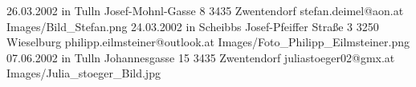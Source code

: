 
\begin{Diplomandenvorstellung}
		  {26.03.2002 in Tulln}
		  {Josef-Mohnl-Gasse 8}
		  {3435 Zwentendorf}
		  {
		  }
		  {stefan.deimel@aon.at}
		  {Images/Bild_Stefan.png}
\newpage	  
\if{}
\blankpage
\fi
{}
		  {24.03.2002 in Scheibbs}
		  {Josef-Pfeiffer Straße 3}
		  {3250 Wieselburg}
		  {
		  }
		  {philipp.eilmsteiner@outlook.at}
		  {Images/Foto_Philipp_Eilmsteiner.png}
\newpage
\if{}
\blankpage
\fi
{}
		  {07.06.2002 in Tulln}
		  {Johannesgasse 15}
		  {3435 Zwentendorf}
		  {
		  }
		  {juliastoeger02@gmx.at}
		  {Images/Julia_stoeger_Bild.jpg}
		  
\end{Diplomandenvorstellung}

